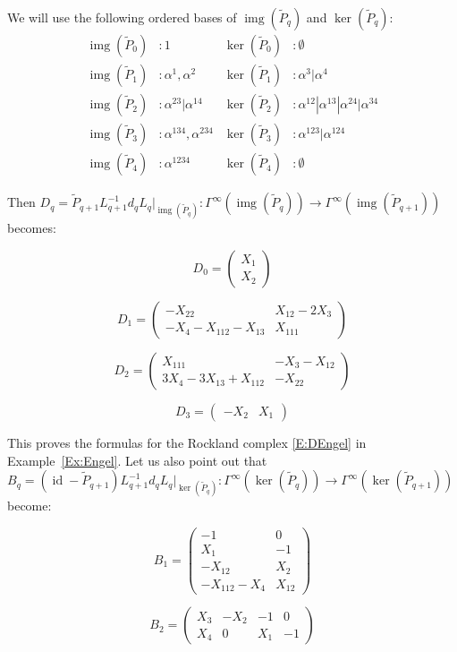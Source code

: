 \documentclass[reqno,12pt]{amsart}
\DeclareMathOperator{\img}{img}
\DeclareMathOperator{\id}{id}
\theoremstyle{plain}
\theoremstyle{definition}
\begin{document}
We will use the following ordered bases of $\img(\tilde P_q)$ and $\ker(\tilde P_q)$:
\begin{align*}
\img(\tilde P_0)&:1
&\ker(\tilde P_0)&:\emptyset
\\
\img(\tilde P_1)&:\alpha^1,\alpha^2
&\ker(\tilde P_1)&:\alpha^3|\alpha^4
\\
\img(\tilde P_2)&:\alpha^{23}|\alpha^{14}
&\ker(\tilde P_2)&:\alpha^{12}|\alpha^{13}|\alpha^{24}|\alpha^{34}
\\
\img(\tilde P_3)&:\alpha^{134},\alpha^{234}
&\ker(\tilde P_3)&:\alpha^{123}|\alpha^{124}
\\
\img(\tilde P_4)&:\alpha^{1234}
&\ker(\tilde P_4)&:\emptyset
\end{align*}


Then $D_q=\tilde P_{q+1}L_{q+1}^{-1}d_qL_q|_{\img(\tilde P_q)}\colon\Gamma^\infty(\img(\tilde P_q))\to\Gamma^\infty(\img(\tilde P_{q+1}))$ becomes:

$$
D_0=\left(\begin{array}{c}X_1\\X_2\end{array}\right)
$$

$$
D_1=\left(\begin{array}{cc}-X_{22}&X_{12}-2X_3\\\hline-X_4-X_{112}-X_{13}&X_{111}\end{array}\right)
$$

$$
D_2=\left(\begin{array}{c|c}X_{111}&-X_3-X_{12}\\ 3X_4-3X_{13}+X_{112}&-X_{22}\end{array}\right)
$$

$$
D_3=\left(\begin{array}{cc}-X_2&X_1\end{array}\right)
$$


This proves the formulas for the Rockland complex \eqref{E:DEngel} in Example~\ref{Ex:Engel}.
Let us also point out that $B_q=(\id-\tilde P_{q+1})L_{q+1}^{-1}d_qL_q|_{\ker(\tilde P_q)}\colon\Gamma^\infty(\ker(\tilde P_q))\to\Gamma^\infty(\ker(\tilde P_{q+1}))$ become:

$$
B_1=\left(\begin{array}{c|c}-1&0\\\hline X_1&-1\\\hline-X_{12}&X_2\\\hline -X_{112}-X_4&X_{12}\end{array}\right)
$$

$$
B_2=\left(\begin{array}{c|c|c|c}X_3&-X_2&-1&0\\\hline X_4&0&X_1&-1\end{array}\right)
$$
\end{document}
